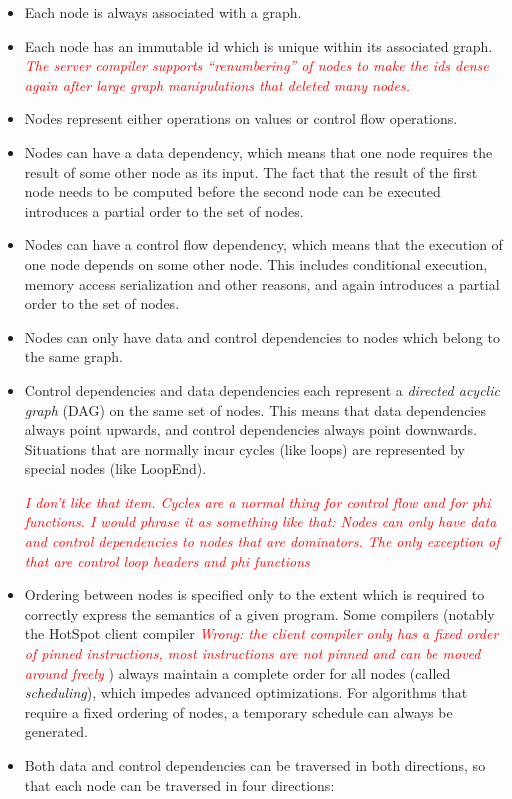 \documentclass[twocolumn]{svjour3}
\newcommand{\mynote}[2]{
\textcolor{red}{\fbox{\bfseries\sffamily\scriptsize#1}
  {\small\textsf{\emph{#2}}}
\fbox{\bfseries\sffamily\scriptsize }}}
\newcommand\cw[1]{\mynote{CW}{#1}}
\begin{document}
\begin{itemize}
    \item Each node is always associated with a graph.
    \item Each node has an immutable id which is unique within its associated graph. \cw{The server compiler supports ``renumbering'' of nodes to make the ids dense again after large graph manipulations that deleted many nodes.}
    \item Nodes represent either operations on values or control flow operations.
    \item Nodes can have a data dependency, which means that one node requires the result of some other node as its input. The fact that the result of the first node needs to be computed before the second node can be executed introduces a partial order to the set of nodes.
    \item Nodes can have a control flow dependency, which means that the execution of one node depends on some other node. This includes conditional execution, memory access serialization and other reasons, and again introduces a partial order to the set of nodes.
    \item Nodes can only have data and control dependencies to nodes which belong to the same graph.
    \item Control dependencies and data dependencies each represent a \emph{directed acyclic graph} (DAG) on the same set of nodes. This means that data dependencies always point upwards, and control dependencies always point downwards. Situations that are normally incur cycles (like loops) are represented by special nodes (like LoopEnd).
		\cw{I don't like that item.  Cycles are a normal thing for control flow and for phi functions.  I would phrase it as something like that: Nodes can only have data and control dependencies to nodes that are dominators.  The only exception of that are control loop headers and phi functions}
    \item Ordering between nodes is specified only to the extent which is required to correctly express the semantics of a given program. Some compilers (notably the HotSpot client compiler \cw{Wrong: the client compiler only has a fixed order of pinned instructions, most instructions are not pinned and can be moved around freely}) always maintain a complete order for all nodes (called \emph{scheduling}), which impedes advanced optimizations. For algorithms that require a fixed ordering of nodes, a temporary schedule can always be generated.
    \item Both data and control dependencies can be traversed in both directions, so that each node can be traversed in four directions:

\end{itemize}
\end{document}
